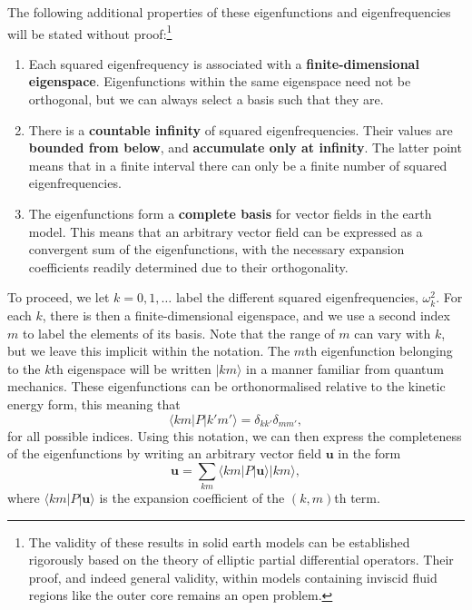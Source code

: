 The following additional properties of these eigenfunctions and eigenfrequencies will be stated without proof:\footnote{The validity 
of these results in solid earth models can be established rigorously based on the theory of elliptic partial differential operators. 
Their proof, and indeed general validity, within models containing inviscid fluid regions like the outer core remains an open problem.}
\begin{enumerate}
    \item Each squared eigenfrequency is associated with a \textbf{finite-dimensional eigenspace}. Eigenfunctions within the same 
    eigenspace need not be orthogonal, but we can always select a basis such that they are.

    \item There is a \textbf{countable infinity} of squared eigenfrequencies. Their values are \textbf{bounded from below}, and
     \textbf{accumulate only at infinity}. The latter point means that in a finite interval there can only be a finite number
      of squared eigenfrequencies.

    \item The eigenfunctions form a \textbf{complete basis} for vector fields in the earth model. This means that an arbitrary vector 
    field can be expressed as a convergent sum of the eigenfunctions, with the necessary expansion coefficients readily determined due to 
    their orthogonality.
\end{enumerate}


To proceed, we let $k=0,1,\dots$ label the different squared eigenfrequencies, $\omega_{k}^{2}$. For each $k$, there is then a 
finite-dimensional eigenspace, and we use a second index $m$ to label the elements of its basis. Note that the range of $m$ can 
vary with $k$, but we leave this implicit within the notation. The $m$th eigenfunction belonging to the $k$th eigenspace will be 
written $|km\rangle$ in a manner familiar from quantum mechanics. These eigenfunctions can be orthonormalised relative to the kinetic 
energy form, this meaning that
\begin{equation}
\langle km|P|k'm'\rangle=\delta_{kk'}\delta_{mm'},
\label{eq:25}
\end{equation}
for all possible indices. Using this notation, we can then express the completeness of the eigenfunctions by writing 
an arbitrary vector field $\mathbf{u}$ in the form
\begin{equation}
\mathbf{u}=\sum_{km}\langle km|P|\mathbf{u}\rangle|km\rangle,
\label{eq:26}
\end{equation}
where $\langle km|P|\mathbf{u}\rangle$ is the expansion coefficient of the $(k,m)$th term.

